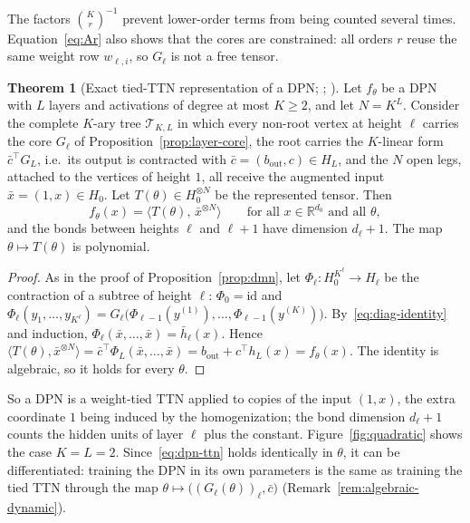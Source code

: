\documentclass[11pt]{article}
\newcommand{\R}{\mathbb{R}}
\newcommand{\ip}[2]{\langle #1,#2\rangle}
\newcommand{\xb}{\bar{x}}
\newcommand{\hb}{\bar{h}}
\newcommand{\cb}{\bar{c}}
\theoremstyle{definition}
\newtheorem{theorem}{Theorem}[section]
\numberwithin{equation}{section}
\begin{document}
The factors $\binom Kr^{-1}$ prevent lower-order terms from being counted several times. Equation~\eqref{eq:Ar} also shows that the cores are constrained: all orders $r$ reuse the same weight row $w_{\ell,i}$, so $G_\ell$ is not a free tensor.

\begin{theorem}[Exact tied-TTN representation of a DPN; {\citealp[Proposition~1]{hfl_local}}; {\citealp[Proposition~1]{hfl_surrogate}}]\label{thm:dpn-ttn}
Let $f_\theta$ be a DPN with $L$ layers and activations of degree at most $K\ge2$, and let $N=K^L$. Consider the complete $K$-ary tree $\mathcal T_{K,L}$ in which every non-root vertex at height $\ell$ carries the core $G_\ell$ of Proposition~\ref{prop:layer-core}, the root carries the $K$-linear form $\cb^\top G_L$, i.e.\ its output is contracted with $\cb=(b_{\mathrm{out}},c)\in H_L$, and the $N$ open legs, attached to the vertices of height $1$, all receive the augmented input $\xb=(1,x)\in H_0$. Let $T(\theta)\in H_0^{\otimes N}$ be the represented tensor. Then
\begin{equation}\label{eq:dpn-ttn}
f_\theta(x)=\big\langle T(\theta),\,\xb^{\otimes N}\big\rangle\qquad\text{for all }x\in\R^{d_0}\text{ and all }\theta,
\end{equation}
and the bonds between heights $\ell$ and $\ell+1$ have dimension $d_\ell+1$. The map $\theta\mapsto T(\theta)$ is polynomial.
\end{theorem}

\begin{proof}
As in the proof of Proposition~\ref{prop:dmn}, let $\Phi_\ell:H_0^{K^\ell}\to H_\ell$ be the contraction of a subtree of height $\ell$: $\Phi_0=\mathrm{id}$ and $\Phi_\ell(y_1,\dots,y_{K^\ell})=G_\ell\big(\Phi_{\ell-1}(y^{(1)}),\dots,\Phi_{\ell-1}(y^{(K)})\big)$. By~\eqref{eq:diag-identity} and induction, $\Phi_\ell(\xb,\dots,\xb)=\hb_\ell(x)$. Hence $\ip{T(\theta)}{\xb^{\otimes N}}=\cb^\top\Phi_L(\xb,\dots,\xb)=b_{\mathrm{out}}+c^\top h_L(x)=f_\theta(x)$. The identity is algebraic, so it holds for every $\theta$.
\end{proof}

So a DPN is a weight-tied TTN applied to copies of the input $(1,x)$, the extra coordinate $1$ being induced by the homogenization; the bond dimension $d_\ell+1$ counts the hidden units of layer $\ell$ plus the constant. Figure~\ref{fig:quadratic} shows the case $K=L=2$. Since~\eqref{eq:dpn-ttn} holds identically in $\theta$, it can be differentiated: training the DPN in its own parameters is the same as training the tied TTN through the map $\theta\mapsto\big((G_\ell(\theta))_\ell,\cb\big)$ (Remark~\ref{rem:algebraic-dynamic}).
\end{document}
